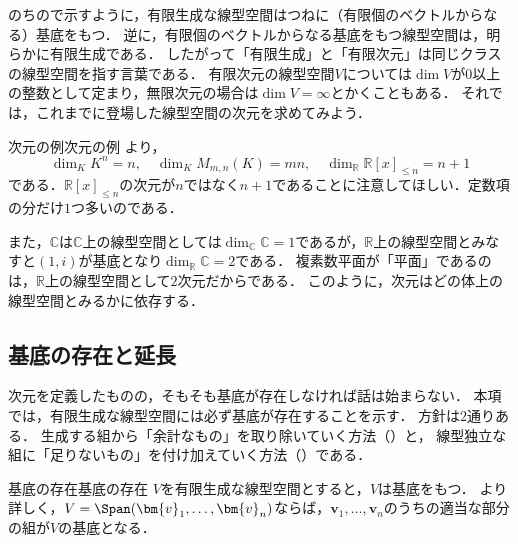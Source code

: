 のちので示すように，有限生成な線型空間はつねに（有限個のベクトルからなる）基底をもつ．
逆に，有限個のベクトルからなる基底をもつ線型空間は，明らかに有限生成である．
したがって「有限生成」と「有限次元」は同じクラスの線型空間を指す言葉である．
有限次元の線型空間$V$については$\dim V$が$0$以上の整数として定まり，無限次元の場合は$\dim V=\infty$とかくこともある．
それでは，これまでに登場した線型空間の次元を求めてみよう．

\begin{example}{次元の例}{次元の例}
  より，
  \[
    \dim_K K^n = n,
    \quad
    \dim_K M_{m,n}(K) = mn,
    \quad
    \dim_{\mathbb{R}} \mathbb{R}[x]_{\le n} = n + 1
  \]
  である．$\mathbb{R}[x]_{\le n}$の次元が$n$ではなく$n+1$であることに注意してほしい．定数項の分だけ$1$つ多いのである．

  また，$\mathbb{C}$は$\mathbb{C}$上の線型空間としては$\dim_{\mathbb{C}} \mathbb{C} = 1$であるが，$\mathbb{R}$上の線型空間とみなすと$(1, i)$が基底となり$\dim_{\mathbb{R}} \mathbb{C} = 2$である．
  複素数平面が「平面」であるのは，$\mathbb{R}$上の線型空間として$2$次元だからである．
  このように，次元はどの体上の線型空間とみるかに依存する．
\end{example}

\subsection{基底の存在と延長}

次元を定義したものの，そもそも基底が存在しなければ話は始まらない．
本項では，有限生成な線型空間には必ず基底が存在することを示す．
方針は$2$通りある．
生成する組から「余計なもの」を取り除いていく方法（）と，
線型独立な組に「足りないもの」を付け加えていく方法（）である．

\begin{theorem}{基底の存在}{基底の存在}
  $V$を有限生成な線型空間とすると，$V$は基底をもつ．
  より詳しく，$V = \Span(\bm{v}_1, \dots, \bm{v}_n)$ならば，$\bm{v}_1, \dots, \bm{v}_n$のうちの適当な部分の組が$V$の基底となる．
\end{theorem}

